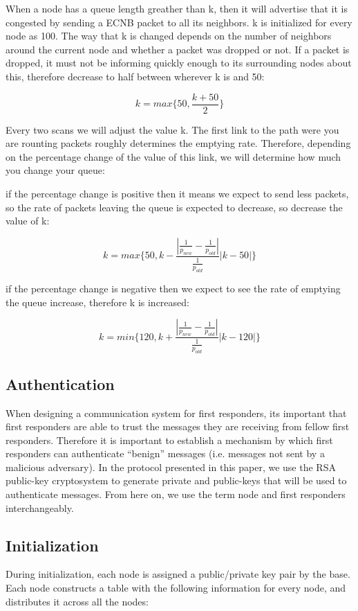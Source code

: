 \documentclass[letterpaper]{article}
\begin{document}
When a node has a queue length greather than k, then it will advertise that it is congested by sending a ECNB packet to all its neighbors. k is initialized for every node as 100. The way that k is changed depends on the number of neighbors around the current node and whether a packet was dropped or not. If a packet is dropped, it must not be informing quickly enough to its surrounding nodes about this, therefore decrease to half between wherever k is and 50:

$$ k = max\{50, \frac{k + 50}{2} \}$$

Every two scans we will adjust the value k. The first link to the path were you are rounting packets roughly determines the emptying rate. Therefore, depending on the percentage change of the value of this link, we will determine how much you change your queue:

if the percentage change is positive then it means we expect to send less packets, so the rate of packets leaving the queue is expected to decrease, so decrease the value of k:

$$ k = max\{50, k -  \frac{|\frac{1}{p_{new}} - \frac{1}{p_{old}}|}{\frac{1}{p_{old}}}|k - 50|   \}$$ 

if the percentage change is negative then we expect to see the rate of emptying the queue increase, therefore k is increased:

$$ k = min\{120, k +  \frac{|\frac{1}{p_{new}} - \frac{1}{p_{old}}|}{\frac{1}{p_{old}}}|k - 120|   \}$$ 

\subsection{Authentication}
When designing a communication system for first responders, its important that first responders are able to trust the messages they are receiving from fellow first responders. Therefore it is important to establish a mechanism by which first responders can authenticate “benign” messages (i.e. messages not sent by a malicious adversary). In the protocol presented in this paper, we use the RSA public-key cryptosystem to generate private and public-keys that will be used to authenticate messages. From here on, we use the term node and first responders interchangeably.

\subsection{Initialization}
During initialization, each node is assigned a public/private key pair by the base. Each node constructs a table with the following information for every node, and distributes it across all the nodes:
\end{document}
